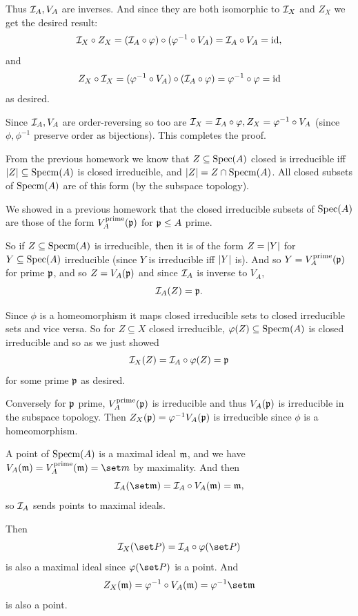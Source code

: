     Thus ${{\cal I}}_A,V_A$ are inverses.
    And since they are both isomorphic to ${{\cal I}}_X$ and $Z_X$ we get the desired result:
    $$ {{\cal I}}_X\circ Z_X = ({{\cal I}}_A\circ\varphi)\circ(\varphi^{-1}\circ V_A) = {{\cal I}}_A\circ V_A = {\rm id}, $$
    and
    $$ Z_X\circ{{\cal I}}_X = (\varphi^{-1}\circ V_A)\circ({{\cal I}}_A\circ\varphi) = \varphi^{-1}\circ\varphi = {\rm id} $$
    as desired.

    Since ${{\cal I}}_A,V_A$ are order-reversing so too are ${{\cal I}}_X={{\cal I}}_A\circ\varphi,Z_X=\varphi^{-1}\circ V_A$ (since $\phi,\phi^{-1}$ preserve order
    as bijections).
    This completes the proof.

    \item From the previous homework we know that $Z\subseteq{\rm Spec}(A)$ closed is irreducible iff $\mathopen{}\mathclose{\left|Z\right|}\subseteq{\rm Specm}(A)$ is closed
    irreducible, and $\mathopen{}\mathclose{\left|Z\right|}=Z\cap{\rm Specm}(A)$.
    All closed subsets of ${\rm Specm}(A)$ are of this form (by the subspace topology).

    We showed in a previous homework that the closed irreducible subsets of ${\rm Spec}(A)$ are those of the form $V_A^{\rm prime}({{\frak p}})$ for ${{\frak p}}\leq A$
    prime.

    So if $Z\subseteq{\rm Specm}(A)$ is irreducible, then it is of the form $Z=\mathopen{}\mathclose{\left|Y\right|}$ for $Y\subseteq{\rm Spec}(A)$ irreducible (since $Y$ is irreducible
    iff $\mathopen{}\mathclose{\left|Y\right|}$ is).
    And so $Y=V_A^{\rm prime}({{\frak p}})$ for prime ${{\frak p}}$, and so $Z=V_A({{\frak p}})$ and since ${{\cal I}}_A$ is inverse to $V_A$,
    $$ {{\cal I}}_A(Z) = {{\frak p}} . $$

    Since $\phi$ is a homeomorphism it maps closed irreducible sets to closed irreducible sets and vice versa.
    So for $Z\subseteq X$ closed irreducible, $\varphi(Z)\subseteq{\rm Specm}(A)$ is closed irreducible and so as we just showed
    $$ {{\cal I}}_X(Z) = {{\cal I}}_A\circ\varphi(Z) = {{\frak p}} $$
    for some prime ${{\frak p}}$ as desired.

    Conversely for ${{\frak p}}$ prime, $V_A^{\rm prime}({{\frak p}})$ is irreducible and thus $V_A({{\frak p}})$ is irreducible in the subspace topology.
    Then $Z_X({{\frak p}})=\varphi^{-1}V_A({{\frak p}})$ is irreducible since $\phi$ is a homeomorphism.

    \item A point of ${\rm Specm}(A)$ is a maximal ideal ${{\frak m}}$, and we have $V_A(\m)=V_A^\prime(\m)=\set m$ by maximality.
    And then
    $$ \I_A(\set\m) = \I_A\circ V_A(\m) = \m , $$
    so ${{\cal I}}_A$ sends points to maximal ideals.

    Then
    $$ \I_X(\set P) = \I_A\circ\phi(\set P) $$
    is also a maximal ideal since $\phi(\set P)$ is a point.
    And
    $$ Z_X(\m) = \phi^{-1}\circ V_A(\m) = \phi^{-1}\set\m $$
    is also a point.

